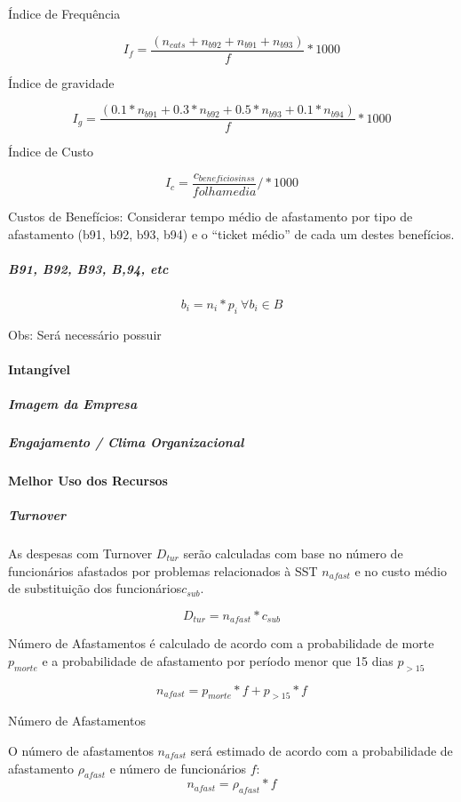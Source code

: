 \documentclass[]{article}
\let\oldparagraph\paragraph
\renewcommand{\paragraph}[1]{\oldparagraph{#1}\mbox{}}
\let\oldsubparagraph\subparagraph
\renewcommand{\subparagraph}[1]{\oldsubparagraph{#1}\mbox{}}
\begin{document}
Índice de Frequência

\[I_f = \frac{(n_{cats}+n_{b92}+n_{b91}+n_{b93})}{f} * 1000\]

Índice de gravidade

\[I_g = \frac{(0.1*n_{b91}+0.3*n_{b92}+0.5*n_{b93}+0.1*n_{b94})}{f}* 1000\]

Índice de Custo

\[I_c = \frac{c_{beneficios inss}}{folha media}/ * 1000\]

Custos de Benefícios: Considerar tempo médio de afastamento por tipo de
afastamento (b91, b92, b93, b94) e o ``ticket médio'' de cada um destes
benefícios.

\subparagraph{B91, B92, B93, B,94, etc}\label{b91-b92-b93-b94-etc}

\[b_i = n_i * p_i \ \forall b_i \in B\]

Obs: Será necessário possuir

\paragraph{Intangível}\label{intangivel}

\subparagraph{Imagem da Empresa}\label{imagem-da-empresa}

\subparagraph{Engajamento / Clima
Organizacional}\label{engajamento-clima-organizacional}

\paragraph{Melhor Uso dos Recursos}\label{melhor-uso-dos-recursos}

\subparagraph{Turnover}\label{turnover}

As despesas com Turnover \(D_{tur}\) serão calculadas com base no número
de funcionários afastados por problemas relacionados à SST \(n_{afast}\)
e no custo médio de substituição dos funcionários\(c_{sub}\).

\[D_{tur} = n_{afast} * c_{sub}\]

Número de Afastamentos é calculado de acordo com a probabilidade de
morte \(p_{morte}\) e a probabilidade de afastamento por período menor
que 15 dias \(p_{>15}\)

\[n_{afast} = p_{morte}*f + p_{>15}*f\]

Número de Afastamentos

O número de afastamentos \(n_{afast}\) será estimado de acordo com a
probabilidade de afastamento \(\rho_{afast}\) e número de funcionários
\(f\): \[n_{afast} = \rho_{afast} * f \]
\end{document}
